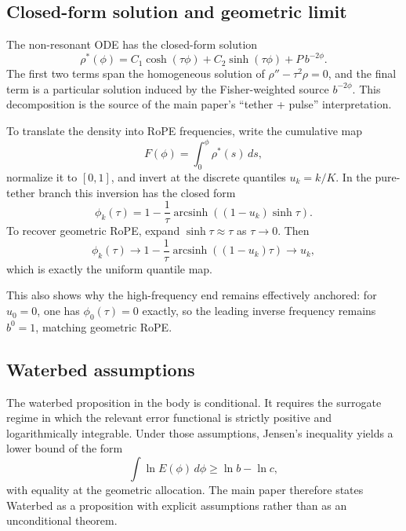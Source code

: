 \subsection{Closed-form solution and geometric limit}

The non-resonant ODE has the closed-form solution
\begin{equation}
\rho^*(\phi)=C_1\cosh(\tau\phi)+C_2\sinh(\tau\phi)+P\,b^{-2\phi}.
\end{equation}
The first two terms span the homogeneous solution of \(\rho''-\tau^2\rho=0\), and the final term is a particular solution induced by the Fisher-weighted source \(b^{-2\phi}\). This decomposition is the source of the main paper's ``tether + pulse'' interpretation.

To translate the density into RoPE frequencies, write the cumulative map
\begin{equation}
F(\phi)=\int_0^\phi \rho^*(s)\,ds,
\end{equation}
normalize it to \([0,1]\), and invert at the discrete quantiles \(u_k=k/K\). In the pure-tether branch this inversion has the closed form
\begin{equation}
\phi_k(\tau)
=
1-\frac{1}{\tau}\operatorname{arcsinh}\!\left((1-u_k)\sinh\tau\right).
\end{equation}
To recover geometric RoPE, expand \(\sinh\tau\approx\tau\) as \(\tau\to 0\). Then
\begin{equation}
\phi_k(\tau)\to 1-\frac{1}{\tau}\operatorname{arcsinh}((1-u_k)\tau)\to u_k,
\end{equation}
which is exactly the uniform quantile map.

This also shows why the high-frequency end remains effectively anchored: for \(u_0=0\), one has \(\phi_0(\tau)=0\) exactly, so the leading inverse frequency remains \(b^0=1\), matching geometric RoPE.

\subsection{Waterbed assumptions}

The waterbed proposition in the body is conditional. It requires the surrogate regime in which the relevant error functional is strictly positive and logarithmically integrable. Under those assumptions, Jensen's inequality yields a lower bound of the form
\begin{equation}
\int \ln E(\phi)\,d\phi \ge \ln b - \ln c,
\end{equation}
with equality at the geometric allocation. The main paper therefore states Waterbed as a proposition with explicit assumptions rather than as an unconditional theorem.

